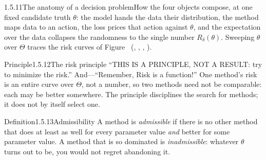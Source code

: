 \documentclass[main.tex]{subfiles}
\begin{document}
\begin{Fig}{1.5.11}{The anatomy of a decision problem}{How the four objects compose, at one
fixed candidate truth $\theta$: the model hands the data their distribution, the method maps
data to an action, the loss prices that action against $\theta$, and the expectation over the
data collapses the randomness to the single number $R_{\delta}(\theta)$. Sweeping $\theta$
over $\Theta$ traces the risk curves of Figure~
(, , , ).}
\end{Fig}

\begin{Obj}{Principle}{1.5.12}{The risk principle}
``THIS IS A PRINCIPLE, NOT A RESULT: try to minimize the risk.'' And---``Remember, Risk is a
function!'' One method's risk is an entire curve over $\Theta$, not a number, so two methods
need not be comparable: each may be better somewhere. The principle disciplines the search for
methods; it does not by itself select one.
\end{Obj}

\begin{Obj}{Definition}{1.5.13}{Admissibility}
A method is \emph{admissible} if there is no other method that does at least as well for every
parameter value \emph{and} better for some parameter value. A method that is so dominated is
\emph{inadmissible}: whatever $\theta$ turns out to be, you would not regret abandoning it.
\end{Obj}
\end{document}
